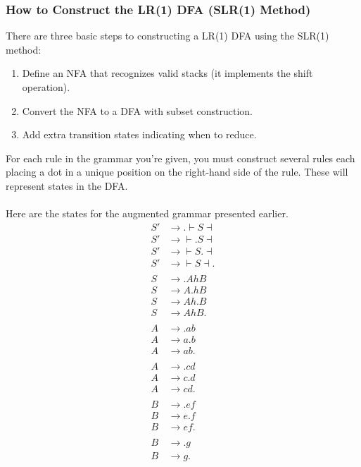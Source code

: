 \documentclass[]{article}
\theoremstyle{definition}
\begin{document}
			\subsubsection{How to Construct the LR(1) DFA (SLR(1) Method)}
				There are three basic steps to constructing a LR(1) DFA using the SLR(1) method:
				\begin{enumerate}
					\item Define an NFA that recognizes valid stacks (it implements the shift operation).
					\item Convert the NFA to a DFA with subset construction.
					\item Add extra transition states indicating when to reduce.
				\end{enumerate}

				For each rule in the grammar you're given, you must construct several rules each placing a dot in a unique position on the right-hand side of the rule. These will represent states in the DFA. 
				\\ \\
				Here are the states for the augmented grammar presented earlier.
				\begin{align*}
					S' &\to . \vdash S \dashv \\
					S' &\to \vdash . S \dashv \\
					S' &\to \vdash S . \dashv \\
					S' &\to \vdash S \dashv .
					\\ \\
					S &\to .AhB \\
					S &\to A.hB \\
					S &\to Ah.B \\
					S &\to AhB.
					\\ \\
					A &\to .ab \\
					A &\to a.b \\
					A &\to ab.
					\\ \\
					A &\to .cd \\
					A &\to c.d \\
					A &\to cd.
					\\ \\
					B &\to .ef \\
					B &\to e.f \\
					B &\to ef.
					\\ \\
					B &\to .g \\
					B &\to g.
				\end{align*}
\end{document}
